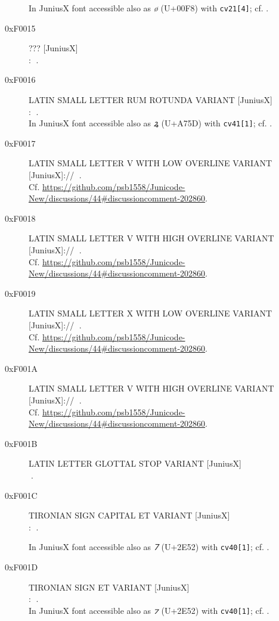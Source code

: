 \documentclass{mwart}
\newcommand{\Jglyph}[1]{{\relsize{2}\J#1}}
\begin{document}
\begin{description}
  In JuniusX font accessible also as \textit{ø} (U+00F8) with \texttt{cv21[4]};
  cf. \autocite[p. 9]{baker20:_opent_featur_junius_junius}.
\item [0xF0015] ???  [JuniusX]\\:
  \Jglyph{󰀕}.\\%
\item [0xF0016] LATIN SMALL LETTER RUM ROTUNDA VARIANT [JuniusX]\\:
  \Jglyph{󰀖}.\\%

  In JuniusX font accessible also as \textit{ꝝ} (U+A75D) with \texttt{cv41[1]};
  cf. \autocite[p. 12]{baker20:_opent_featur_junius_junius}.
\item [0xF0017] LATIN SMALL LETTER V WITH LOW OVERLINE VARIANT [JuniusX]:// 
  \Jglyph{󰀗}.\\ Cf. \url{https://github.com/psb1558/Junicode-New/discussions/44#discussioncomment-202860}.
\item [0xF0018] LATIN SMALL LETTER V WITH HIGH OVERLINE VARIANT [JuniusX]:// 
  \Jglyph{󰀘}.\\ Cf. \url{https://github.com/psb1558/Junicode-New/discussions/44#discussioncomment-202860}.
\item [0xF0019] LATIN SMALL LETTER X WITH LOW OVERLINE VARIANT [JuniusX]:// 
  \Jglyph{󰀙}.\\ Cf. \url{https://github.com/psb1558/Junicode-New/discussions/44#discussioncomment-202860}.
\item [0xF001A] LATIN SMALL LETTER V WITH HIGH OVERLINE VARIANT [JuniusX]:// 
  \Jglyph{󰀚}.\\ Cf. \url{https://github.com/psb1558/Junicode-New/discussions/44#discussioncomment-202860}.
\item [0xF001B] LATIN LETTER GLOTTAL STOP VARIANT [JuniusX]\\
  \Jglyph{󰀛}.\\%
\item [0xF001C] TIRONIAN SIGN CAPITAL ET VARIANT [JuniusX]\\:
\Jglyph{󰀜}.%

In JuniusX font accessible also as \textit{⹒} (U+2E52) with \texttt{cv40[1]};
  cf. \autocite[p. 12]{baker20:_opent_featur_junius_junius}.

\item [0xF001D] TIRONIAN SIGN ET VARIANT [JuniusX]\\:
  \Jglyph{󰀝}.\\%
  In JuniusX font accessible also as \textit{⁊} (U+2E52) with \texttt{cv40[1]};
  cf. \autocite[p. 12]{baker20:_opent_featur_junius_junius}.
\end{description}

\printbibliography
\end{document}

